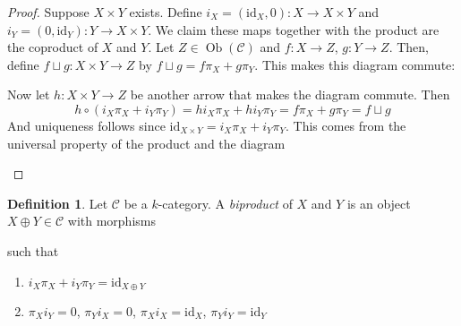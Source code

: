 \documentclass{article}
\newcommand{\id}{\mathrm{id}}
\newcommand{\cat}{\mathcal{C}}
\DeclareMathOperator{\Ob}{Ob}
\theoremstyle{plain}
\theoremstyle{definition}
\newtheorem{definition}[theorem]{Definition}
\theoremstyle{remark}
\begin{document}
\begin{proof}
    Suppose $X \times Y$ exists. Define $i_X = (\id_X, 0) : X \to X\times Y$ and $i_Y = (0,\id_Y) : Y \to X \times Y$. We claim these maps together with the product are the coproduct of $X$ and $Y$. Let $Z \in \Ob(\cat)$ and $f : X \to Z$, $g : Y \to Z$. Then, define $f \sqcup g : X \times Y \to Z$ by $f \sqcup g = f\pi_X + g \pi_Y$. This makes this diagram commute:
    \begin{center}
    \end{center}
    Now let $h : X\times Y \to Z$ be another arrow that makes the diagram commute. Then
    \[h \circ (i_X \pi_X + i_Y \pi_Y) = h i_X \pi_X + h i_Y \pi _Y = f\pi_X + g \pi_Y = f \sqcup g\]
    And uniqueness follows since $\id_{X\times Y} = i_X \pi_X + i_Y \pi_Y$. This comes from the universal property of the product and the diagram
    \begin{center}
    \end{center}
\end{proof}

\begin{definition}
    Let $\cat$ be a $k$-category. A \emph{biproduct} of $X$ and $Y$ is an object $X \oplus Y \in \cat$ with morphisms  such that
    \begin{enumerate}
        \item $i_X \pi_X + i_Y \pi_Y = \id_{X\oplus Y}$
        \item $\pi_X i_Y = 0$, $\pi_Y i_X = 0$, $\pi_X i_X = \id_X$, $\pi_Y i_Y = \id_Y$
    \end{enumerate}
\end{definition}
\end{document}
